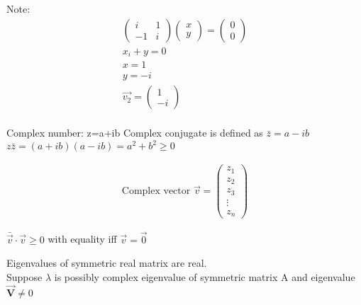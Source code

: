     
    Note:
    \begin{equation*}
      \begin{array}{l}
        \begin{pmatrix}
            i & 1 \\
            -1 & i
        \end{pmatrix}
        \begin{pmatrix}
            x \\
            y
        \end{pmatrix}
        =
        \begin{pmatrix}
            0 \\
            0
        \end{pmatrix}\\
        x_{i}+y =0 \\
        x=1\\
        y=-i\\
        \Vec{v_{2}} =
        \begin{pmatrix}
          1 \\
          -i
        \end{pmatrix}\\
      \end{array}
    \end{equation*}
    
    Complex number: z=a+ib
    Complex conjugate is defined as $\bar{z}=a-ib$
    $z\bar{z} = (a+ib)(a-ib) = a^2 + b^2 \geq 0$
    
    \begin{equation*}
      \begin{array}{l}
      \text{Complex vector  } \Vec{v}=
        \begin{pmatrix}
            z_{1} \\
            z_{2} \\
            z_{3} \\
            \vdots \\
            z_{n}
        \end{pmatrix}
      \end{array}
    \end{equation*}
    
    \begin{center}
        $\bar{\Vec{v}} \cdot \Vec{v} \geq 0$ with equality iff $\Vec{v} = \Vec{0}$
    \end{center}
    \vspace{20px}
    
    Eigenvalues of symmetric real matrix are real. \\
    Suppose $\lambda$ is possibly complex eigenvalue of symmetric matrix A and eigenvalue $\Vec{\mathbf{V}} \neq 0$
    \vspace{10px}
    
